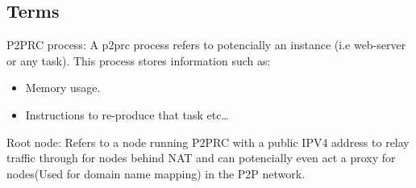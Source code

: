 \documentclass[11pt]{article}
\begin{document}
\subsection{Terms}
\label{sec:org2f4d383}
P2PRC process: A p2prc process refers to potencially an instance (i.e web-server or any task). This process
stores information such as:
\begin{itemize}
\item Memory usage.
\item Instructions to re-produce that task etc\ldots{}
\end{itemize}

Root node: Refers to a node running P2PRC with a public IPV4 address to relay traffic through for nodes
behind NAT and can potencially even act a proxy for nodes(Used for domain name mapping) in the P2P network.  
\end{document}
